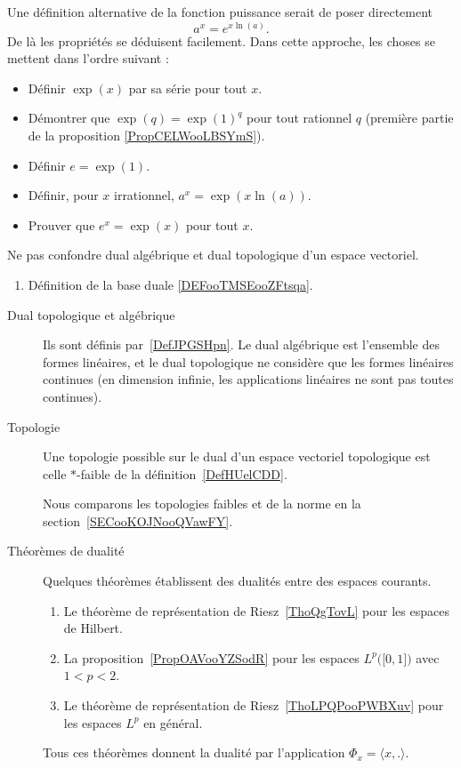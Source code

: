 Une définition alternative de la fonction puissance serait de poser directement
\begin{equation*}
    a^x=e^{x\ln(a)}.
\end{equation*}
De là les propriétés se déduisent facilement. Dans cette approche, les choses se mettent dans l'ordre suivant :
\begin{itemize}
    \item Définir \( \exp(x)\) par sa série pour tout \( x\).
    \item Démontrer que \( \exp(q)=\exp(1)^q\) pour tout rationnel \( q\) (première partie de la proposition \ref{PropCELWooLBSYmS}).
    \item Définir \( e=\exp(1)\).
    \item Définir, pour \( x\) irrationnel, \( a^x=\exp(x\ln(a))\).
    \item Prouver que \( e^x=\exp(x)\) pour tout \( x\).
\end{itemize}


     \label{THEMEooULGFooPscFJC}

Ne pas confondre dual algébrique et dual topologique d'un espace vectoriel.

\begin{enumerate}
    \item
        Définition de la base duale \ref{DEFooTMSEooZFtsqa}.
\end{enumerate}

\begin{description}
    \item[Dual topologique et algébrique]
        Ils sont définis par~\ref{DefJPGSHpn}. Le dual algébrique est l'ensemble des formes linéaires, et le dual topologique ne considère que les formes linéaires continues (en dimension infinie, les applications linéaires ne sont pas toutes continues).
    \item[Topologie]
        Une topologie possible sur le dual d'un espace vectoriel topologique est celle \( *\)-faible de la définition~\ref{DefHUelCDD}.

        Nous comparons les topologies faibles et de la norme en la section~\ref{SECooKOJNooQVawFY}.
    \item[Théorèmes de dualité]
        Quelques théorèmes établissent des dualités entre des espaces courants.
\begin{enumerate}
    \item
        Le théorème de représentation de Riesz~\ref{ThoQgTovL} pour les espaces de Hilbert.
    \item
        La proposition~\ref{PropOAVooYZSodR} pour les espaces \( L^p\big( \mathopen[ 0 , 1 \mathclose] \big)\) avec \( 1<p<2\).
    \item
        Le théorème de représentation de Riesz~\ref{ThoLPQPooPWBXuv} pour les espaces \( L^p\) en général.
\end{enumerate}
Tous ces théorèmes donnent la dualité par l'application \( \Phi_x=\langle x, .\rangle \).

\end{description}


